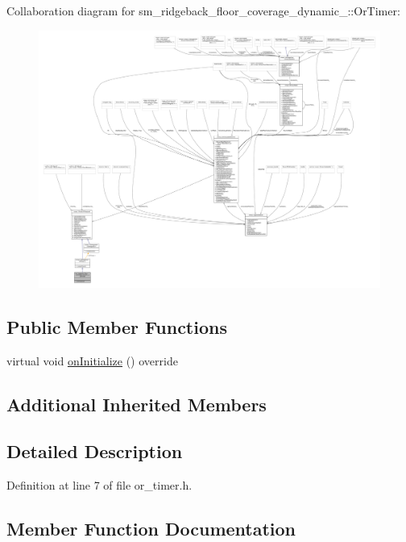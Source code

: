 Collaboration diagram for sm\+\_\+ridgeback\+\_\+floor\+\_\+coverage\+\_\+dynamic\+\_\+:\+:Or\+Timer\+:
\nopagebreak
\begin{figure}[H]
\begin{center}
\leavevmode
\includegraphics[width=350pt]{classsm__ridgeback__floor__coverage__dynamic__1_1_1OrTimer__coll__graph}
\end{center}
\end{figure}
\subsection*{Public Member Functions}
\begin{DoxyCompactItemize}
\item 
virtual void \hyperlink{classsm__ridgeback__floor__coverage__dynamic__1_1_1OrTimer_aad2bbd43de3231354372066394231e21}{on\+Initialize} () override
\end{DoxyCompactItemize}
\subsection*{Additional Inherited Members}


\subsection{Detailed Description}


Definition at line 7 of file or\+\_\+timer.\+h.



\subsection{Member Function Documentation}
\mbox{\label{classsm__ridgeback__floor__coverage__dynamic__1_1_1OrTimer_aad2bbd43de3231354372066394231e21}} 
